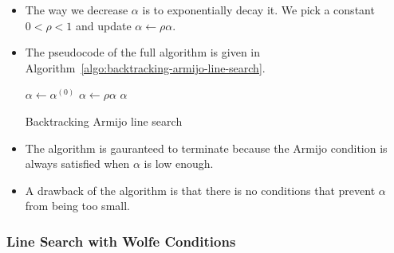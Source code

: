 \documentclass[10pt]{article}
\begin{document}
\begin{itemize}
    \item The way we decrease $\alpha$ is to exponentially decay it. We pick a constant $0 < \rho < 1$ and update $\alpha \gets \rho \alpha$.

    \item The pseudocode of the full algorithm is given in Algorithm~\ref{algo:backtracking-armijo-line-search}. 
    
    \begin{algorithm}[t]
    \begin{algorithmic}
        \State $\alpha \gets \alpha^{(0)}$
            \State $\alpha \gets \rho \alpha$
        \EndWhile
        \State \Return $\alpha$
        \EndProcedure             
    \end{algorithmic}
    \caption{Backtracking Armijo line search}
    \label{algo:backtracking-armijo-line-search}
    \end{algorithm}

    \item The algorithm is gauranteed to terminate because the Armijo condition is always satisfied when $\alpha$ is low enough.
    
    \item A drawback of the algorithm is that there is no conditions that prevent $\alpha$ from being too small.
\end{itemize}

\subsubsection{Line Search with Wolfe Conditions}
\end{document}
